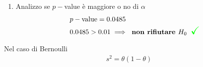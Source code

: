 \documentclass{article}  %
\theoremstyle{definition}
\begin{document}
\begin{esercizio}
\begin{enumerate}
		\begin{align*}
			\textcolor{red}{P(\overline{x} < z_{oss})} &= P(Z < z_{oss}) \\
			&= \phi(z_{oss}) \\
			&= \phi(-1.66) \\
			&= 1- \phi(1.66) \\
			&= 1- 0.9515 = 0.0485
		\end{align*}
		\item Analizzo se $p-$value è maggiore o no di $\alpha$
		\begin{align*}
			&p-\text{value}=0.0485 \\
			& 0.0485 > 0.01 \implies \text{ \textbf{non rifiutare $H_0$}} \textcolor{green}{\scalebox{1.6}{ \checkmark}}
		\end{align*}
	\end{enumerate}
\end{esercizio}

\begin{osservazioni}
	Nel caso di Bernoulli
	\begin{align*}
			s^2=\theta(1-\theta)
	\end{align*}
\end{osservazioni} 
\end{document}
